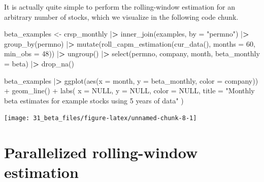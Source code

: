 \documentclass[
]{book}
\newenvironment{Shaded}{\begin{snugshade}}{\end{snugshade}}
\newcommand{\AttributeTok}[1]{\textcolor[rgb]{0.61,0.61,0.61}{#1}}
\newcommand{\ConstantTok}[1]{\textcolor[rgb]{0,0,0}{#1}}
\newcommand{\DecValTok}[1]{\textcolor[rgb]{0.06,0.06,0.06}{#1}}
\newcommand{\ErrorTok}[1]{\textcolor[rgb]{0.14,0.14,0.14}{\textbf{#1}}}
\newcommand{\FunctionTok}[1]{\textcolor[rgb]{0,0,0}{#1}}
\newcommand{\NormalTok}[1]{#1}
\newcommand{\OtherTok}[1]{\textcolor[rgb]{0.37,0.37,0.37}{#1}}
\newcommand{\SpecialCharTok}[1]{\textcolor[rgb]{0,0,0}{#1}}
\newcommand{\StringTok}[1]{\textcolor[rgb]{0.5,0.5,0.5}{#1}}
\begin{document}
It is actually quite simple to perform the rolling-window estimation for an arbitrary number of stocks, which we visualize in the following code chunk.

\begin{Shaded}
\begin{Highlighting}[]
\NormalTok{beta\_examples }\OtherTok{\textless{}{-}}\NormalTok{ crsp\_monthly }\SpecialCharTok{|}\ErrorTok{\textgreater{}}
  \FunctionTok{inner\_join}\NormalTok{(examples, }\AttributeTok{by =} \StringTok{"permno"}\NormalTok{) }\SpecialCharTok{|}\ErrorTok{\textgreater{}}
  \FunctionTok{group\_by}\NormalTok{(permno) }\SpecialCharTok{|}\ErrorTok{\textgreater{}}
  \FunctionTok{mutate}\NormalTok{(}\FunctionTok{roll\_capm\_estimation}\NormalTok{(}\FunctionTok{cur\_data}\NormalTok{(), }\AttributeTok{months =} \DecValTok{60}\NormalTok{, }\AttributeTok{min\_obs =} \DecValTok{48}\NormalTok{)) }\SpecialCharTok{|}\ErrorTok{\textgreater{}}
  \FunctionTok{ungroup}\NormalTok{() }\SpecialCharTok{|}\ErrorTok{\textgreater{}}
  \FunctionTok{select}\NormalTok{(permno, company, month, }\AttributeTok{beta\_monthly =}\NormalTok{ beta) }\SpecialCharTok{|}\ErrorTok{\textgreater{}}
  \FunctionTok{drop\_na}\NormalTok{()}

\NormalTok{beta\_examples }\SpecialCharTok{|}\ErrorTok{\textgreater{}}
  \FunctionTok{ggplot}\NormalTok{(}\FunctionTok{aes}\NormalTok{(}\AttributeTok{x =}\NormalTok{ month, }\AttributeTok{y =}\NormalTok{ beta\_monthly, }\AttributeTok{color =}\NormalTok{ company)) }\SpecialCharTok{+}
  \FunctionTok{geom\_line}\NormalTok{() }\SpecialCharTok{+}
  \FunctionTok{labs}\NormalTok{(}
    \AttributeTok{x =} \ConstantTok{NULL}\NormalTok{, }\AttributeTok{y =} \ConstantTok{NULL}\NormalTok{, }\AttributeTok{color =} \ConstantTok{NULL}\NormalTok{,}
    \AttributeTok{title =} \StringTok{"Monthly beta estimates for example stocks using 5 years of data"}
\NormalTok{  )}
\end{Highlighting}
\end{Shaded}

\begin{center}\texttt{[image: 31\_beta\_files/figure-latex/unnamed-chunk-8-1]} \end{center}

\hypertarget{parallelized-rolling-window-estimation}{%
\section{Parallelized rolling-window estimation}\label{parallelized-rolling-window-estimation}}
\end{document}
